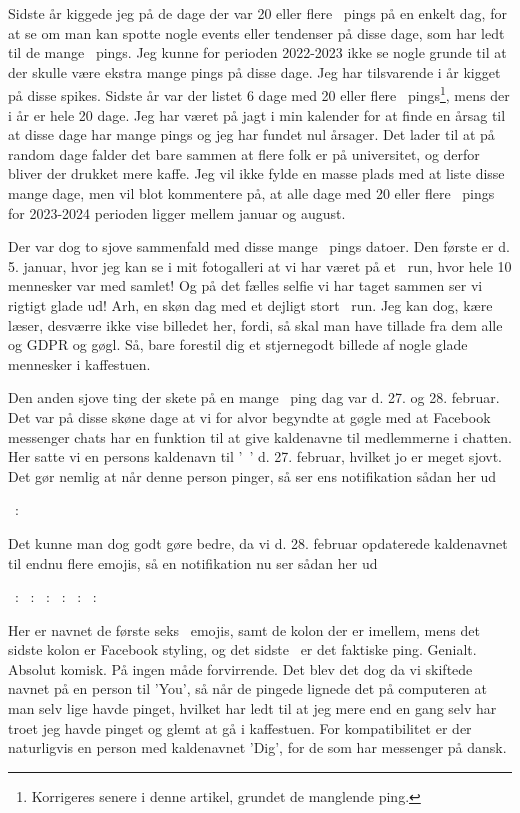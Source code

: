 \begin{article}
Sidste år kiggede jeg på de dage der var 20 eller flere \coffee\ pings på en enkelt dag, for at se om man kan spotte nogle events eller tendenser på disse dage, som har ledt til de mange \coffee\ pings. Jeg kunne for perioden 2022-2023 ikke se nogle grunde til at der skulle være ekstra mange pings på disse dage.
Jeg har tilsvarende i år kigget på disse spikes. Sidste år var der listet 6 dage med 20 eller flere \coffee\ pings\footnote{Korrigeres senere i denne artikel, grundet de manglende ping.}, mens der i år er hele 20 dage. Jeg har været på jagt i min kalender for at finde en årsag til at disse dage har mange pings og jeg har fundet nul årsager. Det lader til at på random dage falder det bare sammen at flere folk er på universitet, og derfor bliver der drukket mere kaffe. Jeg vil ikke fylde en masse plads med at liste disse mange dage, men vil blot kommentere på, at alle dage med 20 eller flere \coffee\ pings for 2023-2024 perioden ligger mellem januar og august.

Der var dog to sjove sammenfald med disse mange \coffee\ pings datoer. Den første er d. 5. januar, hvor jeg kan se i mit fotogalleri at vi har været på et \coffee\ run, hvor hele 10 mennesker var med samlet! Og på det fælles selfie vi har taget sammen ser vi rigtigt glade ud! Arh, en skøn dag med et dejligt stort \coffee\ run. Jeg kan dog, kære læser, desværre ikke vise billedet her, fordi, så skal man have tillade fra dem alle og GDPR og gøgl. Så, bare forestil dig et stjernegodt billede af nogle glade mennesker i kaffestuen.

Den anden sjove ting der skete på en mange \coffee\ ping dag var d. 27. og 28. februar. Det var på disse skøne dage at vi for alvor begyndte at gøgle med at Facebook messenger chats har en funktion til at give kaldenavne til medlemmerne i chatten. Her satte vi en persons kaldenavn til '\coffee\ ' d. 27. februar, hvilket jo er meget sjovt. Det gør nemlig at når denne person pinger, så ser ens notifikation sådan her ud
\begin{center}
	\coffee\ : \coffee\
\end{center}
Det kunne man dog godt gøre bedre, da vi d. 28. februar opdaterede kaldenavnet til endnu flere emojis, så en notifikation nu ser sådan her ud
\begin{center}
	\coffee\ : \coffee\ : \coffee\ : \coffee\ : \coffee\ : \coffee\ : \coffee\
\end{center}
Her er navnet de første seks \coffee\ emojis, samt de kolon der er imellem, mens det sidste kolon er Facebook styling, og det sidste \coffee\ er det faktiske ping. Genialt. Absolut komisk. På ingen måde forvirrende.
Det blev det dog da vi skiftede navnet på en person til 'You', så når de pingede lignede det på computeren at man selv lige havde pinget, hvilket har ledt til at jeg mere end en gang selv har troet jeg havde pinget og glemt at gå i kaffestuen. For kompatibilitet er der naturligvis en person med kaldenavnet 'Dig', for de som har messenger på dansk.



\end{article}
